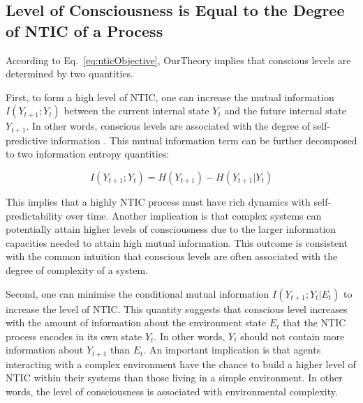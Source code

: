 \documentclass[utf8]{article}
\begin{document}
		
	    \subsection{Level of Consciousness is Equal to the Degree of NTIC of a Process}\label{sec:cl}
            According to Eq.~\ref{eq:nticObjective}, \ac{OurTheory} implies that conscious levels are determined by two quantities. 
            
            First, to form a high level of NTIC, one can increase the mutual information $I(Y_{t+1};Y_{t})$ between the current internal state $Y_t$ and the future internal state $Y_{t+1}$. In other words, conscious levels are associated with the degree of self-predictive information \citep{bialek2001predictability}. This mutual information term can be further decomposed to two information entropy quantities: 
            
            \begin{equation}
            \label{eq:SelfEntropy}
            I(Y_{t+1};Y_{t}) = H(Y_{t+1}) - H(Y_{t+1}|Y_t)
            \end{equation}
            
            This implies that a highly NTIC process must have rich dynamics with self-predictability over time. Another implication is that complex systems can potentially attain higher levels of consciousness due to the larger information capacities needed to attain high mutual information. This outcome is consistent with the common intuition that conscious levels are often associated with the degree of complexity of a system.
    
    	    Second, one can minimise the conditional mutual information $I(Y_{t+1};Y_{t}|E_{t})$ to increase the level of NTIC. This quantity suggests that conscious level increases with the amount of information about the environment state $E_t$ that the NTIC process encodes in its own state $Y_t$. In other words, $Y_t$ should not contain more information about $Y_{t+1}$ than $E_t$. An important implication is that agents interacting with a complex environment have the chance to build a higher level of NTIC within their systems than those living in a simple environment. In other words, the level of consciousness is associated with environmental complexity. 
    	   
\end{document}
